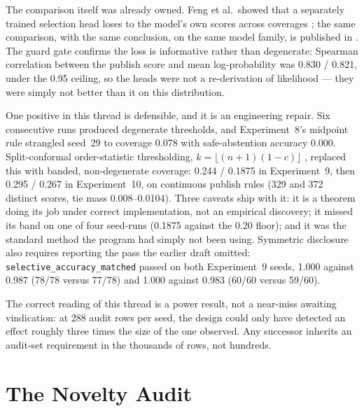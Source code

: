 \documentclass[10pt,a4paper]{article}
\begin{document}
The comparison itself was already owned. Feng et al.\ showed that a separately
trained selection head loses to the model's own scores across
coverages \cite{feng2023}; the same comparison, with the same conclusion, on
the same model family, is published in \cite{phalod2026selfverif}. The guard
gate confirms the loss is informative rather than degenerate: Spearman
correlation between the publish score and mean log-probability was 0.830 /
0.821, under the 0.95 ceiling, so the heads were not a re-derivation of
likelihood --- they were simply not better than it on this distribution.

One positive in this thread is defensible, and it is an engineering repair.
Six consecutive runs produced degenerate thresholds, and Experiment~8's
midpoint rule strangled seed~29 to coverage 0.078 with safe-abstention
accuracy 0.000. Split-conformal order-statistic thresholding,
$k=\lfloor(n+1)(1-c)\rfloor$ \cite{vovk2005,angelopoulos2021}, replaced this
with banded, non-degenerate coverage: 0.244 / 0.1875 in Experiment~9, then
0.295 / 0.267 in Experiment~10, on continuous publish rules (329 and 372
distinct scores, tie mass 0.008--0.0104). Three caveats ship with it: it is a
theorem doing its job under correct implementation, not an empirical
discovery; it missed its band on one of four seed-runs (0.1875 against the
0.20 floor); and it was the standard method the program had simply not been
using. Symmetric disclosure also requires reporting the pass the earlier draft
omitted: \texttt{selective\_accuracy\_matched} passed on both Experiment~9
seeds, 1.000 against 0.987 (78/78 versus 77/78) and 1.000 against 0.983 (60/60
versus 59/60).

The correct reading of this thread is a power result, not a near-miss awaiting
vindication: at 288 audit rows per seed, the design could only have detected
an effect roughly three times the size of the one observed. Any successor
inherits an audit-set requirement in the thousands of rows, not hundreds.

\section{The Novelty Audit}\label{sec:audit}
\end{document}
